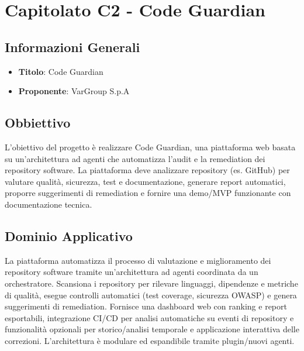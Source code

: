\documentclass[a4paper,12pt]{article}
\begin{document}
    \section{Capitolato C2 - Code Guardian}
    \subsection{Informazioni Generali}
        \begin{itemize}
            \item \textbf{Titolo}: Code Guardian
            \item \textbf{Proponente}: VarGroup S.p.A
        \end{itemize}
    \subsection{Obbiettivo}
    L’obiettivo del progetto è realizzare Code Guardian, una piattaforma web basata su un’architettura ad agenti che automatizza l’audit e la remediation dei repository software. La piattaforma deve analizzare repository (es. GitHub) per valutare qualità, sicurezza, test e documentazione, generare report automatici, proporre suggerimenti di remediation e fornire una demo/MVP funzionante con documentazione tecnica.
    \subsection{Dominio Applicativo}
    La piattaforma automatizza il processo di valutazione e miglioramento dei repository software tramite un’architettura ad agenti coordinata da un orchestratore. Scansiona i repository per rilevare linguaggi, dipendenze e metriche di qualità, esegue controlli automatici (test coverage, sicurezza OWASP) e genera suggerimenti di remediation. Fornisce una dashboard web con ranking e report esportabili, integrazione CI/CD per analisi automatiche su eventi di repository e funzionalità opzionali per storico/analisi temporale e applicazione interattiva delle correzioni. L’architettura è modulare ed espandibile tramite plugin/nuovi agenti.\\
\end{document}
